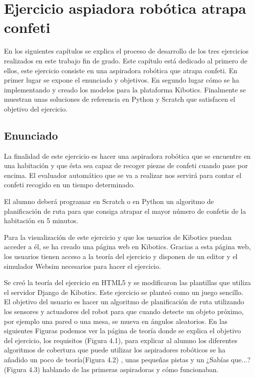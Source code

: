 \chapter{Ejercicio aspiadora robótica atrapa confeti}\label{chap:aspiradora}
En los siguientes capítulos se explica el proceso de desarrollo de los tres ejercicios realizados en este trabajo fin de grado. Este capítulo está dedicado al primero de ellos, este ejercicio consiste en una aspiradora robótica que atrapa confeti. En primer lugar se expone el enunciado y objetivos. En segundo lugar cómo se ha implementando y creado los modelos para la plataforma Kibotics. Finalmente se muestran unas soluciones de referencia en Python y Scratch que satisfacen el objetivo del ejercicio.


\section{Enunciado}
La finalidad de este ejercicio es hacer una aspiradora robótica que se encuentre en una habitación y que ésta sea capaz de recoger piezas de confeti cuando pase por encima. El evaluador automático que se va a realizar nos servirá para contar el confeti recogido en un tiempo determinado.

El alumno deberá programar en Scratch o en Python un algoritmo de planificación de ruta para que consiga atrapar el mayor número de confetis de la habitación en 5 minutos.

Para la visualización de este ejercicio y que los usuarios de Kibotics puedan acceder a él, se ha creado una página web en Kibotics. Gracias a esta página web, los usuarios tienen acceso a la teoría del ejercicio y  disponen de un editor y el simulador Websim necesarios para hacer el ejercicio. 

Se creó la teoría del ejercicio en HTML5 y se modificaron las plantillas que utiliza el servidor Django de Kibotics. Este ejercicio se planteó como un juego sencillo. El objetivo del usuario  es hacer un algoritmo de planificación de ruta utilizando los sensores y actuadores del robot para que cuando detecte un objeto próximo, por ejemplo una pared o una mesa, se mueva en ángulos aleatorios. 
En las siguientes Figuras podemos ver la página de teoría donde se explica el objetivo del ejercicio, los requisitos (Figura 4.1),  para explicar al alumno los diferentes algoritmos de cobertura que puede utilizar los aspiradores robóticos se ha añadido un poco de teoría(Figura  4.2) , unas pequeñas pistas y un ¿Sabías que...? (Figura 4.3) hablando de las primeras aspiradoras y cómo funcionaban. 


